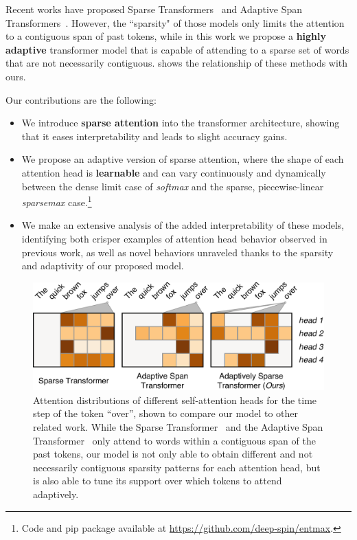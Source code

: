 Recent works have proposed Sparse
Transformers~\citep{openai_sparse_transf} and Adaptive Span
Transformers~\citep{Sukhbaatar2019}. However, the ``sparsity" of those
models only limits the attention to a contiguous span of past tokens,
while in this work we propose a \textbf{highly adaptive} transformer
model that is capable of attending to a sparse set of words that are
not necessarily contiguous.  shows the
relationship of these methods with ours.

Our contributions are the following:

\begin{itemize}
    \item We introduce \textbf{sparse attention} into the
          transformer architecture, showing that it eases
          interpretability and leads to slight accuracy gains.
    \item We propose an adaptive version of sparse attention,
          where the shape of each attention head is {\bf learnable} and can vary continuously and
          dynamically between the dense limit case of \emph{softmax} and the sparse,
          piecewise-linear \emph{sparsemax} case.\footnote{
              Code and pip package available at \url{https://github.com/deep-spin/entmax}.}
    \item We make an extensive analysis of the added interpretability of these
          models, identifying both crisper examples of attention head behavior observed in
          previous work, as well as novel behaviors unraveled thanks to the sparsity
          and adaptivity of our proposed model.
\end{itemize}

\begin{figure}[htbp]
    \centering
    \includegraphics[width=0.95\columnwidth]{Figures/comparison.pdf}
    \caption{Attention distributions of different self-attention heads for the
        time step of the token ``over'', shown to compare our model to other
        related work. While the Sparse
        Transformer~\citep{openai_sparse_transf} and the Adaptive Span
        Transformer~\citep{Sukhbaatar2019} only attend to words within a
        contiguous span of the past tokens, our model is not only able to
        obtain different and not necessarily contiguous sparsity patterns for
        each attention head, but is also able to tune its support over which
        tokens to attend adaptively.}
    \label{fig:comparison}
\end{figure}

